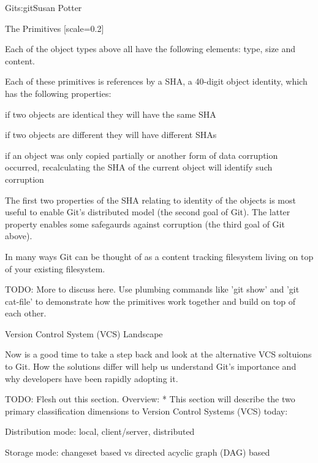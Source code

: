 \begin{aosachapter}{Git}{s:git}{Susan Potter}
\begin{aosasect1}{The Primitives}
[scale=0.2]

Each of the object types above all have the following elements: type, size and
content.

Each of these primitives is references by a SHA, a 40-digit object identity,
which has the following properties:
\begin{aosaitemize}
  \item if two objects are identical they will have the same SHA
  \item if two objects are different they will have different SHAs
  \item if an object was only copied partially or another form of data
        corruption occurred, recalculating the SHA of the current object
        will identify such corruption
\end{aosaitemize}

The first two properties of the SHA relating to identity of the objects is
most useful to enable Git's distributed model (the second goal of Git).
The latter property enables some safegaurds against corruption (the third goal
of Git above).

In many ways Git can be thought of as a content tracking filesystem living on top
of your existing filesystem.

TODO: More to discuss here. Use plumbing commands like 'git show' and 'git cat-file'
to demonstrate how the primitives work together and build on top of each other.

\end{aosasect1}

\begin{aosasect1}{Version Control System (VCS) Landscape}

Now is a good time to take a step back and look at the alternative VCS soltuions
to Git. How the solutions differ will help us understand Git's importance and why 
developers have been rapidly adopting it.

TODO: Flesh out this section. Overview:
* This section will describe the two primary classification dimensions to
Version Control Systems (VCS) today:

\begin{aosaitemize}
  \item Distribution mode: local, client/server, distributed
  \item Storage mode: changeset based vs directed acyclic graph (DAG) based
\end{aosaitemize}


\end{aosasect1}
\end{aosachapter}
